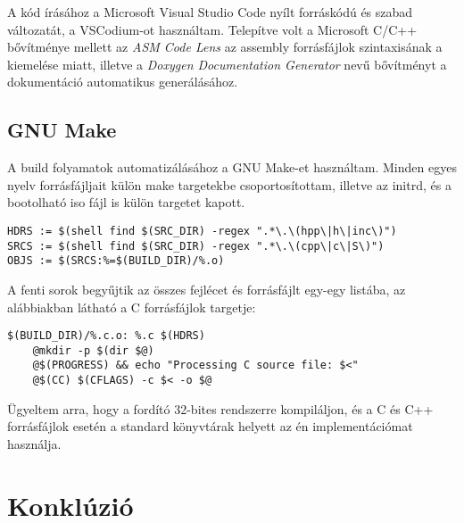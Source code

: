 \documentclass[12pt,numbers=noenddot]{report}
\begin{document}
A kód írásához a Microsoft Visual Studio Code nyílt forráskódú és szabad
változatát, a VSCodium-ot használtam. Telepítve volt a Microsoft C/C++
bővítménye mellett az \textit{ASM Code Lens} az assembly forrásfájlok
szintaxisának a kiemelése miatt, illetve a
\textit{Doxygen Documentation Generator} nevű bővítményt a dokumentáció
automatikus generálásához.


\section{GNU Make}

A build folyamatok automatizálásához a GNU Make-et használtam. Minden egyes
nyelv forrásfájljait külön make targetekbe csoportosítottam, illetve az initrd,
és a bootolható iso fájl is külön targetet kapott.

\begin{verbatim}
HDRS := $(shell find $(SRC_DIR) -regex ".*\.\(hpp\|h\|inc\)")
SRCS := $(shell find $(SRC_DIR) -regex ".*\.\(cpp\|c\|S\)")
OBJS := $(SRCS:%=$(BUILD_DIR)/%.o)
\end{verbatim}

\noindent A fenti sorok begyűjtik az összes fejlécet és forrásfájlt egy-egy
listába, az alábbiakban látható a C forrásfájlok targetje:

\begin{verbatim}
$(BUILD_DIR)/%.c.o: %.c $(HDRS)
    @mkdir -p $(dir $@)
    @$(PROGRESS) && echo "Processing C source file: $<"
    @$(CC) $(CFLAGS) -c $< -o $@
\end{verbatim}

\noindent Ügyeltem arra, hogy a fordító 32-bites rendszerre kompiláljon, és a C
és C++ forrásfájlok esetén a standard könyvtárak helyett az én implementációmat
használja.



\chapter{Konklúzió}
\end{document}
